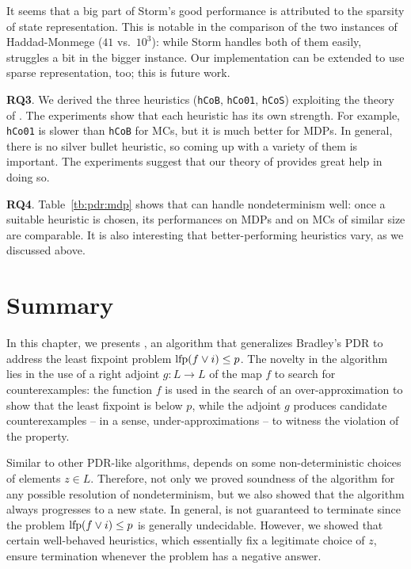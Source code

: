 It seems that a big part of Storm's good performance is attributed to the sparsity of state representation. This is notable in the comparison of the two instances of Haddad-Monmege ($41$ vs.\ $10^3$): while Storm handles both of them easily, \ADPDR{} struggles a bit in the bigger instance. Our implementation can be extended to use sparse representation, too; this is future work.

\textbf{RQ3}.
We derived the three heuristics (\verb|hCoB|, \verb|hCo01|, \verb|hCoS|) exploiting the theory of \ADPDR{}. The experiments show that each heuristic has its own strength. For example, \verb|hCo01| is slower than \verb|hCoB| for MCs, but it is much better for MDPs. In general, there is no silver bullet heuristic, so coming up with a variety of them is important. The experiments suggest that our theory of \ADPDR{} provides great help in doing so.

\textbf{RQ4}.
Table~\ref{tb:pdr:mdp} shows that \ADPDR{} can handle nondeterminism well: once a suitable heuristic is chosen, its performances on MDPs and on MCs of similar size are comparable. It is also interesting that better-performing heuristics vary, as we discussed above.

\section{Summary}\label{sec:pdr:conclusions}
In this chapter, we presents \APDR{}, an algorithm that generalizes Bradley's PDR \cite{Bradley11} to address the least fixpoint problem $\text{lfp}(f\lor i) \le p$. The novelty in the algorithm lies in the use of a right adjoint $g\colon L \to L$ of the map $f$ to search for counterexamples: the function $f$ is used in the search of an over-approximation to show that the least fixpoint is below $p$, while the adjoint $g$ produces candidate counterexamples -- in a sense, under-approximations -- to witness the violation of the property.

Similar to other PDR-like algorithms, \APDR{} depends on some non-deterministic choices of elements $z \in L$. Therefore, not only we proved soundness of the algorithm for any possible resolution of nondeterminism, but we also showed that the algorithm always progresses to a new state. In general, \APDR{} is not guaranteed to terminate since the problem $\text{lfp}(f\lor i) \le p$ is generally undecidable. However, we showed that certain well-behaved heuristics, which essentially fix a legitimate choice of $z$, ensure termination whenever the problem has a negative answer.

